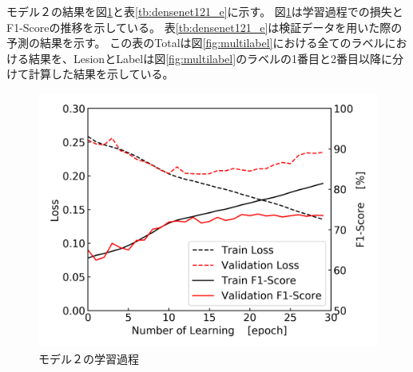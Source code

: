 \newpage
モデル２の結果を図\ref{fig:densenet121_e_result_process}と表\ref{tb:densenet121_e}に示す。
図\ref{fig:densenet121_e_result_process}は学習過程での損失とF1-Scoreの推移を示している。
表\ref{tb:densenet121_e}は検証データを用いた際の予測の結果を示す。
この表のTotalは図\ref{fig:multilabel}における全てのラベルにおける結果を、LesionとLabelは図\ref{fig:multilabel}のラベルの1番目と2番目以降に分けて計算した結果を示している。

\begin{figure}[htbp]
    \begin{center}
        \includegraphics[width=150mm]{./fig/densenet121_e_p02process.png}
        \caption{モデル２の学習過程}
        \label{fig:densenet121_e_result_process}
    \end{center}
\end{figure}

